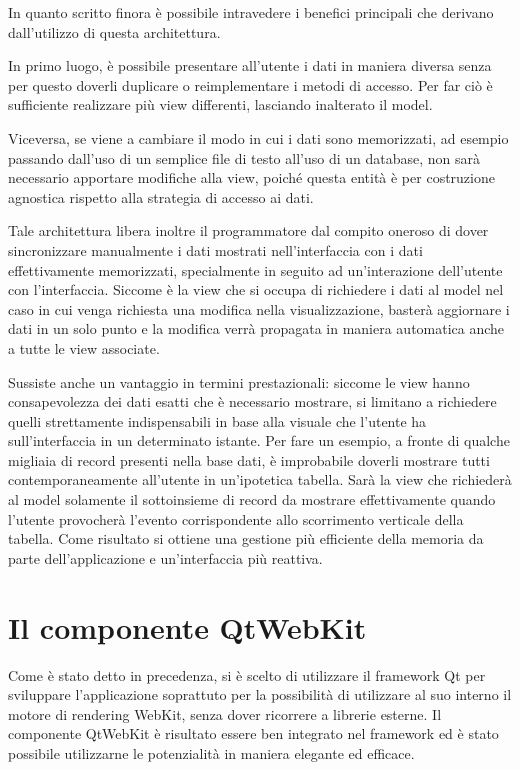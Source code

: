 In quanto scritto finora è possibile intravedere i benefici principali che derivano dall'utilizzo di questa architettura. 

In primo luogo, è possibile presentare all'utente i dati in maniera diversa senza per questo doverli duplicare o reimplementare i metodi di accesso. Per far ciò è sufficiente realizzare più view differenti, lasciando inalterato il model. 

Viceversa, se viene a cambiare il modo in cui i dati sono memorizzati, ad esempio passando dall'uso di un semplice file di testo all'uso di un database, non sarà necessario apportare modifiche alla view, poiché questa entità è per costruzione agnostica rispetto alla strategia di accesso ai dati.

Tale architettura libera inoltre il programmatore dal compito oneroso di dover sincronizzare manualmente i dati mostrati nell'interfaccia con i dati effettivamente memorizzati, specialmente in seguito ad un'interazione dell'utente con l'interfaccia. Siccome è la view che si occupa di richiedere i dati al model nel caso in cui venga richiesta una modifica nella visualizzazione, basterà aggiornare i dati in un solo punto e la modifica verrà propagata in maniera automatica anche a tutte le view associate. 

Sussiste anche un vantaggio in termini prestazionali: siccome le view hanno consapevolezza dei dati esatti che è necessario mostrare, si limitano a richiedere quelli strettamente indispensabili in base alla visuale che l'utente ha sull'interfaccia in un determinato istante. Per fare un esempio, a fronte di qualche migliaia di record presenti nella base dati, è improbabile doverli mostrare tutti contemporaneamente all'utente in un'ipotetica tabella. Sarà la view che richiederà al model solamente il sottoinsieme di record da mostrare effettivamente quando l'utente provocherà l'evento corrispondente allo scorrimento verticale della tabella. Come risultato si ottiene una gestione più efficiente della memoria da parte dell'applicazione e un'interfaccia più reattiva.


\section{Il componente QtWebKit}

Come è stato detto in precedenza, si è scelto di utilizzare il framework Qt per sviluppare l'applicazione soprattuto per la possibilità di utilizzare al suo interno il motore di rendering WebKit, senza dover ricorrere a librerie esterne. Il componente QtWebKit è risultato essere ben integrato nel framework ed è stato possibile utilizzarne le potenzialità in maniera elegante ed efficace.

